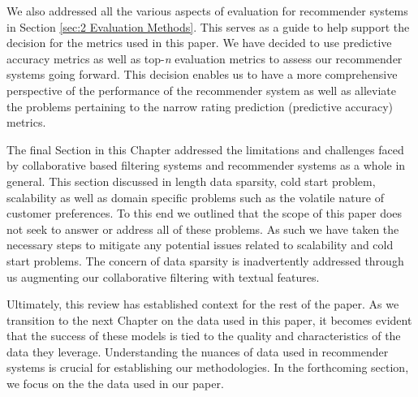 We also addressed all the various aspects of evaluation for recommender systems in Section \ref{sec:2 Evaluation Methods}. This serves as a guide to help support the decision for the metrics used in this paper. We have decided to use predictive accuracy metrics as well as top-\textit{n} evaluation metrics to assess our recommender systems going forward. This decision enables us to have a more comprehensive perspective of the performance of the recommender system as well as alleviate the problems pertaining to the narrow rating prediction (predictive accuracy) metrics.

The final Section in this Chapter addressed the limitations and challenges faced by collaborative based filtering systems and recommender systems as a whole in general. This section discussed in length data sparsity, cold start problem, scalability as well as domain specific problems such as the volatile nature of customer preferences. To this end we outlined that the scope of this paper does not seek to answer or address all of these problems. As such we have taken the necessary steps to mitigate any potential issues related to scalability and cold start problems. The concern of data sparsity is inadvertently addressed through us augmenting our collaborative filtering with textual features.

Ultimately, this review has established context for the rest of the paper. As we transition to the next Chapter on the data used in this paper, it becomes evident that the success of these models is tied to the quality and characteristics of the data they leverage. Understanding the nuances of data used in recommender systems is crucial for establishing our methodologies. In the forthcoming section, we focus on the the data used in our paper. 








 
